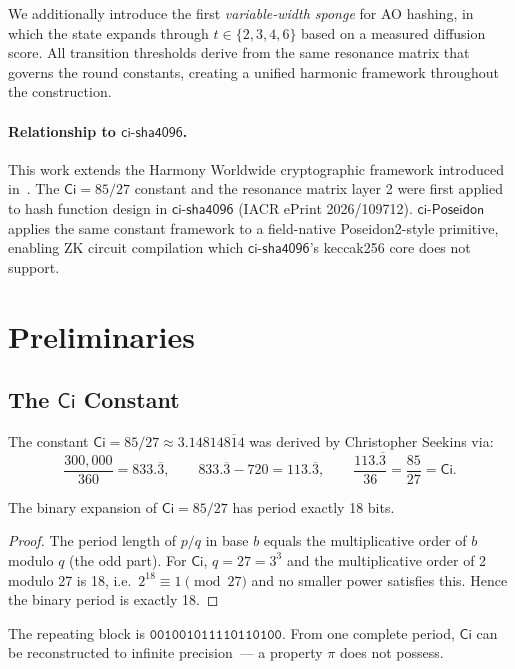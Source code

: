 \documentclass[preprint]{iacrtrans}
\newcommand{\Ci}{\ensuremath{\mathsf{Ci}}}
\newcommand{\ciposeidon}{\ensuremath{\mathsf{ci\text{-}Poseidon}}}
\newcommand{\cisha}{\ensuremath{\mathsf{ci\text{-}sha4096}}}
\begin{document}
We additionally introduce the first \emph{variable-width sponge} for AO
hashing, in which the state expands through $t \in \{2,3,4,6\}$ based on a
measured diffusion score. All transition thresholds derive from the same
resonance matrix that governs the round constants, creating a unified harmonic
framework throughout the construction.

\paragraph{Relationship to \cisha{}.} This work extends the Harmony Worldwide
cryptographic framework introduced in~\cite{See26}. The $\Ci = 85/27$ constant
and the resonance matrix layer 2 were first applied to hash function design in
\cisha{} (IACR ePrint 2026/109712). \ciposeidon{} applies the same constant
framework to a field-native Poseidon2-style primitive, enabling ZK circuit
compilation which \cisha{}'s keccak256 core does not support.

\section{Preliminaries}

\subsection{The \texorpdfstring{$\Ci$}{Ci} Constant}

The constant $\Ci = 85/27 \approx 3.14814\overline{814}$ was derived by
Christopher Seekins via:
\[
  \frac{300{,}000}{360} = 833.\overline{3}, \qquad
  833.\overline{3} - 720 = 113.\overline{3}, \qquad
  \frac{113.\overline{3}}{36} = \frac{85}{27} = \Ci.
\]

\begin{proposition}[Binary period of $\Ci$]
The binary expansion of $\Ci = 85/27$ has period exactly 18 bits.
\end{proposition}
\begin{proof}
The period length of $p/q$ in base $b$ equals the multiplicative order of
$b$ modulo $q$ (the odd part). For $\Ci$, $q = 27 = 3^3$ and the
multiplicative order of 2 modulo 27 is 18, i.e.\ $2^{18} \equiv 1 \pmod{27}$
and no smaller power satisfies this. Hence the binary period is exactly 18.
\end{proof}

The repeating block is $\mathtt{001001011110110100}$. From one complete period,
$\Ci$ can be reconstructed to infinite precision~--- a property $\pi$ does not
possess.
\end{document}
